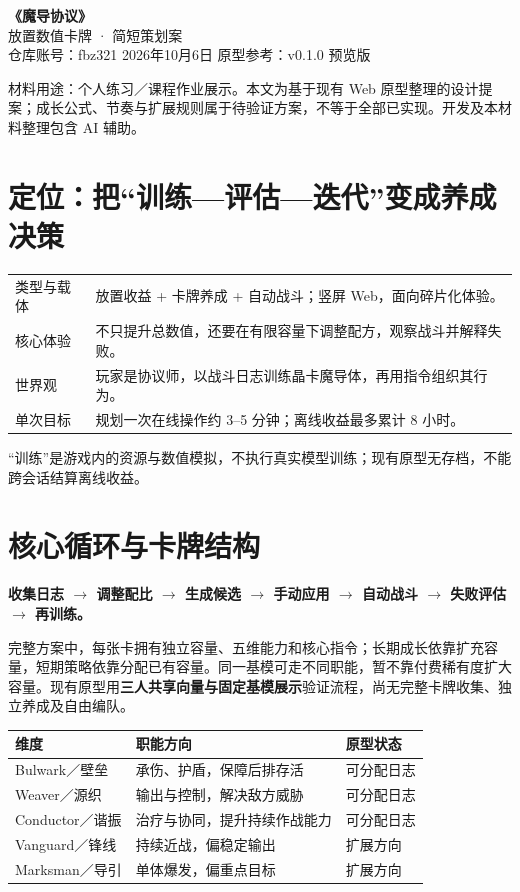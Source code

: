 \documentclass[UTF8,10pt,a4paper,fontset=fandol]{ctexart}
\newcommand{\note}[1]{{\small\color{ink}#1}}
\begin{document}
\begin{center}
{\LARGE\bfseries\color{ink}《魔导协议》}\\[4pt]
{\large 放置数值卡牌 · 简短策划案}\\[5pt]
\small 仓库账号：fbz321 \quad 2026年10月6日 \quad 原型参考：v0.1.0 预览版
\end{center}
\note{材料用途：个人练习／课程作业展示。本文为基于现有 Web 原型整理的设计提案；成长公式、节奏与扩展规则属于待验证方案，不等于全部已实现。开发及本材料整理包含 AI 辅助。}

\section{定位：把“训练—评估—迭代”变成养成决策}
\begin{tabularx}{\linewidth}{@{}lY@{}}\toprule
类型与载体 & 放置收益 + 卡牌养成 + 自动战斗；竖屏 Web，面向碎片化体验。\\
核心体验 & 不只提升总数值，还要在有限容量下调整配方，观察战斗并解释失败。\\
世界观 & 玩家是协议师，以战斗日志训练晶卡魔导体，再用指令组织其行为。\\
单次目标 & 规划一次在线操作约 3--5 分钟；离线收益最多累计 8 小时。\\\bottomrule
\end{tabularx}
\note{“训练”是游戏内的资源与数值模拟，不执行真实模型训练；现有原型无存档，不能跨会话结算离线收益。}

\section{核心循环与卡牌结构}
\textbf{收集日志 $\rightarrow$ 调整配比 $\rightarrow$ 生成候选 $\rightarrow$ 手动应用 $\rightarrow$ 自动战斗 $\rightarrow$ 失败评估 $\rightarrow$ 再训练。}

完整方案中，每张卡拥有独立容量、五维能力和核心指令；长期成长依靠扩充容量，短期策略依靠分配已有容量。同一基模可走不同职能，暂不靠付费稀有度扩大容量。现有原型用\textbf{三人共享向量与固定基模展示}验证流程，尚无完整卡牌收集、独立养成及自由编队。

\begin{tabularx}{\linewidth}{@{}lYl@{}}\toprule
维度 & 职能方向 & 原型状态\\\midrule
Bulwark／壁垒 & 承伤、护盾，保障后排存活 & 可分配日志\\
Weaver／源织 & 输出与控制，解决敌方威胁 & 可分配日志\\
Conductor／谐振 & 治疗与协同，提升持续作战能力 & 可分配日志\\
Vanguard／锋线 & 持续近战，偏稳定输出 & 扩展方向\\
Marksman／导引 & 单体爆发，偏重点目标 & 扩展方向\\\bottomrule
\end{tabularx}
\end{document}
